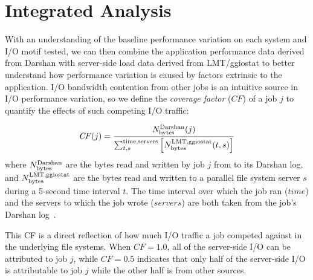 \section{Integrated Analysis} \label{sec:results/umami}

With an understanding of the baseline performance variation on each system and I/O motif tested, we can then combine the application performance data derived from Darshan with server-side load data derived from LMT/ggiostat to
better understand how performance variation is caused by factors extrinsic to the application.
I/O bandwidth contention from other jobs is an intuitive source in I/O performance variation, so we define the \emph{coverage factor} ($\mathit{CF}$) of a job $j$ to quantify the effects of such competing I/O traffic:

\begin{equation} \label{eq:cf}
    \mathit{CF}(j) = \frac{N_{\textup{bytes}}^{\textup{Darshan}}(j)}
    {\sum_{t,s}^{\textup{time,servers}}
    \left [ N_{\textup{bytes}}^{\textup{LMT,ggiostat}}(t,s) \right ] }
\end{equation}
%
where $N_{\textup{bytes}}^{\textup{Darshan}}$ are the bytes read and written by job $j$ from to its Darshan log, and $N_{\textup{bytes}}^{\textup{LMT,ggiostat}}$ are the bytes read and written to a parallel file system server $s$ during a 5-second time interval $t$.
The time interval over which the job ran ($\mathit{time}$) and the servers to which the job wrote ($\mathit{servers}$) are both taken from the job's Darshan log~\cite{snyder2016modular}.

This CF is a direct reflection of how much I/O traffic a job competed against in the underlying file systems.
When $\mathit{CF} = 1.0$, all of the server-side I/O can be attributed to job $j$, while $\mathit{CF} = 0.5$ indicates that only half of the server-side I/O is attributable to job $j$ while the other half is from other sources.

